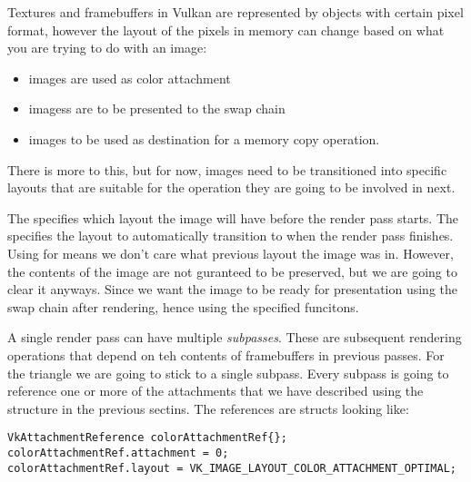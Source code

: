 \par Textures and framebuffers in Vulkan are represented by  objects with certain pixel format, however the layout of the pixels in memory can change based on what you are trying to do with an image:

\begin{itemize}
    \item {} images are used as color attachment
    \item {} imagess are to be presented to the swap chain
    \item {} images to be used as destination for a memory copy operation.
\end{itemize}

\par There is more to this, but for now, images need to be transitioned into specific layouts that are suitable for the operation they are going to be involved in next.

\par The  specifies which layout the image will have before the render pass starts. The  specifies the layout to automatically transition to when the render pass finishes. Using  for  means we don't care what previous layout the image was in. However, the contents of the image are not guranteed to be preserved, but we are going to clear it anyways. Since we want the image to be ready for presentation using the swap chain after rendering, hence using the specified funcitons.

\par A single render pass can have multiple \emph{subpasses}. These are subsequent rendering operations that depend on teh contents of framebuffers in previous passes. For the triangle we are going to stick to a single subpass. Every subpass is going to reference one or more of the attachments that we have described using the structure in the previous sectins. The references are  structs looking like:

\begin{center}
\begin{minipage}{0.95\linewidth}
\begin{lstlisting}
VkAttachmentReference colorAttachmentRef{};
colorAttachmentRef.attachment = 0;
colorAttachmentRef.layout = VK_IMAGE_LAYOUT_COLOR_ATTACHMENT_OPTIMAL;
\end{lstlisting}
\end{minipage}
\end{center}

